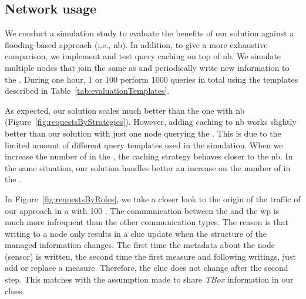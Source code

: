 


\subsection{Network usage} %
\label{sec:NetworkUsage}


We conduct a simulation study to evaluate the benefits of our solution against a flooding-based approach (i.e., \ac{nb}).
In addition, to give a more exhaustive comparison, we implement and test query caching on top of \ac{nb}.
We simulate multiple nodes that join the same \Space{} as \providers{} and periodically write new information to the \Space{}.
During one hour, 1 or 100 \consumers{} perform 1000 queries in total using the templates described in Table~\ref{tab:evaluationTemplates}.

As expected, our solution scales much better than the one with \ac{nb} (Figure~\ref{fig:requestsByStrategies}).
However, adding caching to \ac{nb} works slightly better than our solution with just one node querying the \Space{}.
This is due to the limited amount of different query templates used in the simulation.
When we increase the number of \consumers{} in the \Space{}, the caching strategy behaves closer to the \ac{nb}.
In the same situation, our solution handles better an increase on the number of \consumers{} in the \Space{}.




In Figure~\ref{fig:requestsByRoles}, we take a closer look to the origin of the traffic of our approach in a \Space{} with 100 \consumers{}.
The communication between the \providers{} and the \ac{wp} is much more infrequent than the other communication types.
The reason is that writing to a node only results in a clue update when the structure of the managed information changes.
The first time the metadata about the node (sensor) is written, the second time the first measure and following writings, just add or replace a measure.
Therefore, the clue does not change after the second step.
This matches with the assumption made to share \emph{TBox} information in our clues.

